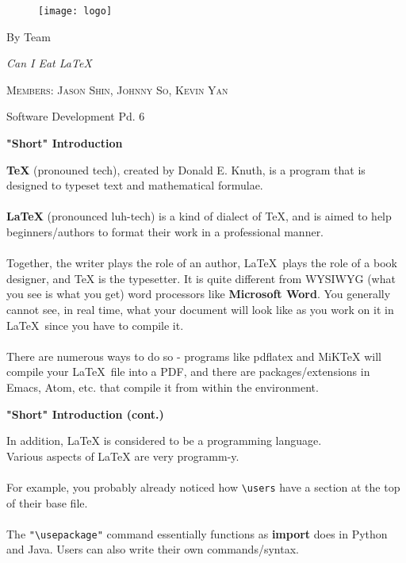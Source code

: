 \documentclass[a4paper,12pt]{article}
\begin{document}
\begin{titlepage}
	\begin{figure}[!ht]
		\centering
			\texttt{[image: logo]}
	\end{figure}
	\vspace{3cm}
	\centering
	{\huge By Team \par}
	\vspace{0.5cm}
	{\huge\itshape Can I Eat LaTeX \par}
	\vspace{2cm}
	{\scshape\Large  Members: Jason Shin, Johnny So, Kevin Yan\par}
	{\large Software Development Pd. 6}
\end{titlepage}
	

\newpage
\begin{center}
  	\bf{\Huge{"Short" Introduction}}
\end{center}
\bigskip
\Large
\textbf{\TeX} (pronouned tech), created by Donald E. Knuth, is a program that is
designed to typeset text and mathematical formulae. \\\\
\textbf{\LaTeX} (pronounced luh-tech) is a kind of dialect of TeX, and is aimed to help beginners/authors to
format their work in a professional manner. \\\\
Together, the writer plays the role of an author, \LaTeX\ plays the role of a book designer, and TeX is the
typesetter. It is quite different from WYSIWYG (what you see is what you get)
word processors like \textbf{Microsoft Word}. You generally cannot see, in real
time, what your document will look like as you work on it in \LaTeX\ since you
have to compile it. \\\\
There are numerous ways to do so - programs like pdflatex and MiKTeX will
compile your \LaTeX\ file into a PDF, and there are packages/extensions in Emacs, Atom, etc. that compile it from within the environment.

\newpage
\begin{center}
	\bf{\Huge{"Short" Introduction (cont.)}}
\end{center}
In addition, LaTeX is considered to be a programming language. \\
Various aspects of LaTeX are very programm-y. \\\\
For example, you probably already noticed
how \verb|\users| have a section at the top of their base file. \\\\
The \verb|"\usepackage"| command essentially functions as \textbf{import} does
in Python and Java. Users can also write their own commands/syntax.
\end{document}
